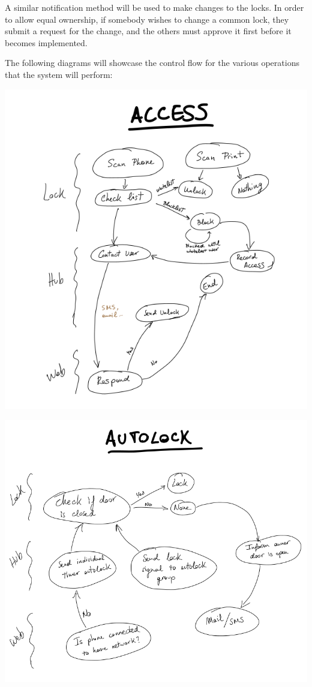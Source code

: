 \documentclass{article}
\begin{document}
A similar notification method will be used to make changes to the locks. In
order to allow equal ownership, if somebody wishes to change a common lock, they
submit a request for the change, and the others must approve it first before it
becomes implemented.

The following diagrams will showcase the control flow for the various operations
that the system will perform:

\includegraphics[scale=0.4]{access_graph.png}

\includegraphics[scale=0.4]{autolock_graph.png}
\end{document}

